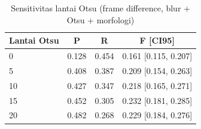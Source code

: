 \begin{table}[t]
\centering
\caption{Sensitivitas lantai Otsu (frame difference, blur + Otsu + morfologi)}
\label{tab:table_otsu_floor}
\begin{tabular}{lccc}
\toprule
Lantai Otsu & P & R & F [CI95] \\
\midrule
0 & 0.128 & 0.454 & 0.161 [0.115, 0.207] \\
5 & 0.408 & 0.387 & 0.209 [0.154, 0.263] \\
10 & 0.427 & 0.347 & 0.218 [0.165, 0.271] \\
15 & 0.452 & 0.305 & 0.232 [0.181, 0.285] \\
20 & 0.482 & 0.268 & 0.229 [0.184, 0.276] \\
\bottomrule
\end{tabular}
\end{table}
